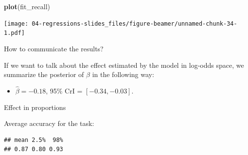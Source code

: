 \documentclass[12pt,ignorenonframetext,aspectratio=169]{beamer}
\newenvironment{Shaded}{\begin{snugshade}}{\end{snugshade}}
\newcommand{\DataTypeTok}[1]{\textcolor[rgb]{0.13,0.29,0.53}{#1}}
\newcommand{\DecValTok}[1]{\textcolor[rgb]{0.00,0.00,0.81}{#1}}
\newcommand{\FloatTok}[1]{\textcolor[rgb]{0.00,0.00,0.81}{#1}}
\newcommand{\KeywordTok}[1]{\textcolor[rgb]{0.13,0.29,0.53}{\textbf{#1}}}
\newcommand{\NormalTok}[1]{#1}
\newcommand{\OperatorTok}[1]{\textcolor[rgb]{0.81,0.36,0.00}{\textbf{#1}}}
\newcommand{\StringTok}[1]{\textcolor[rgb]{0.31,0.60,0.02}{#1}}
\providecommand{\tightlist}{%
  \setlength{\itemsep}{0pt}\setlength{\parskip}{0pt}}
\begin{document}
\begin{frame}[fragile]

\small

\begin{Shaded}
\begin{Highlighting}[]
\KeywordTok{plot}\NormalTok{(fit_recall)}
\end{Highlighting}
\end{Shaded}

\texttt{[image: 04-regressions-slides\_files/figure-beamer/unnamed-chunk-34-1.pdf]}

\normalsize

\end{frame}

\begin{frame}{How to communicate the results?}
\protect\hypertarget{how-to-communicate-the-results-3}{}

\small

\normalsize

If we want to talk about the effect estimated by the model in log-odds space, we summarize the posterior of \(\beta\) in the following way:

\begin{itemize}
\tightlist
\item
  \(\hat\beta = -0.18\), 95\% CrI = \([ -0.34 , -0.03 ]\).
\end{itemize}

\end{frame}

\begin{frame}[fragile]{Effect in proportions}
\protect\hypertarget{effect-in-proportions}{}

Average accuracy for the task:

\scriptsize

\begin{Shaded}
\end{Shaded}

\begin{verbatim}
## mean 2.5%  98% 
## 0.87 0.80 0.93
\end{verbatim}

\normalsize

\end{frame}
\end{document}

